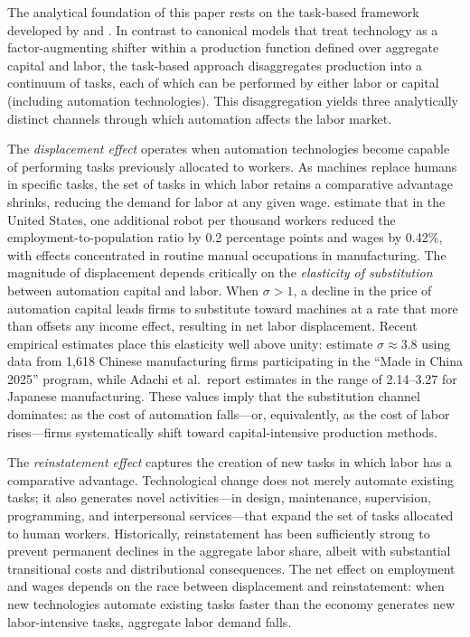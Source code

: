 \documentclass{article}
\begin{document}
The analytical foundation of this paper rests on the task-based framework developed by \cite{acemoglu2019automation} and \cite{acemoglu2020robots}. In contrast to canonical models that treat technology as a factor-augmenting shifter within a production function defined over aggregate capital and labor, the task-based approach disaggregates production into a continuum of tasks, each of which can be performed by either labor or capital (including automation technologies). This disaggregation yields three analytically distinct channels through which automation affects the labor market.

The \textit{displacement effect} operates when automation technologies become capable of performing tasks previously allocated to workers. As machines replace humans in specific tasks, the set of tasks in which labor retains a comparative advantage shrinks, reducing the demand for labor at any given wage. \cite{acemoglu2020robots} estimate that in the United States, one additional robot per thousand workers reduced the employment-to-population ratio by 0.2 percentage points and wages by 0.42\%, with effects concentrated in routine manual occupations in manufacturing. The magnitude of displacement depends critically on the \textit{elasticity of substitution} between automation capital and labor. When $\sigma > 1$, a decline in the price of automation capital leads firms to substitute toward machines at a rate that more than offsets any income effect, resulting in net labor displacement. Recent empirical estimates place this elasticity well above unity: \cite{cheng2021elasticity} estimate $\sigma \approx 3.8$ using data from 1,618 Chinese manufacturing firms participating in the ``Made in China 2025'' program, while Adachi et al.\ report estimates in the range of 2.14--3.27 for Japanese manufacturing. These values imply that the substitution channel dominates: as the cost of automation falls---or, equivalently, as the cost of labor rises---firms systematically shift toward capital-intensive production methods.

The \textit{reinstatement effect} captures the creation of new tasks in which labor has a comparative advantage. Technological change does not merely automate existing tasks; it also generates novel activities---in design, maintenance, supervision, programming, and interpersonal services---that expand the set of tasks allocated to human workers. Historically, reinstatement has been sufficiently strong to prevent permanent declines in the aggregate labor share, albeit with substantial transitional costs and distributional consequences. The net effect on employment and wages depends on the race between displacement and reinstatement: when new technologies automate existing tasks faster than the economy generates new labor-intensive tasks, aggregate labor demand falls.
\end{document}
